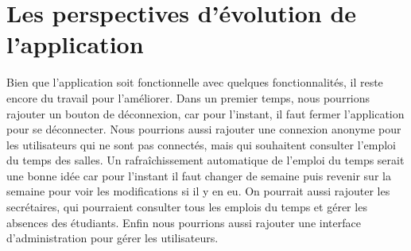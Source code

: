 \documentclass[a4paper,12pt]{article}
\begin{document}
\section{Les perspectives d’évolution de l’application}
Bien que l'application soit fonctionnelle avec quelques fonctionnalités, il reste encore du travail pour l'améliorer.
Dans un premier temps, nous pourrions rajouter un bouton de déconnexion, car pour l'instant, il faut fermer l'application pour se déconnecter.
Nous pourrions aussi rajouter une connexion anonyme pour les utilisateurs qui ne sont pas connectés, mais qui souhaitent consulter l'emploi du temps des salles.
Un rafraîchissement automatique de l'emploi du temps serait une bonne idée car pour l'instant il faut changer de semaine puis revenir sur la semaine pour voir les modifications si il y en eu.
On pourrait aussi rajouter les secrétaires, qui pourraient consulter tous les emplois du temps et gérer les absences des étudiants.
Enfin nous pourrions aussi rajouter une interface d'administration pour gérer les utilisateurs.
\end{document}

